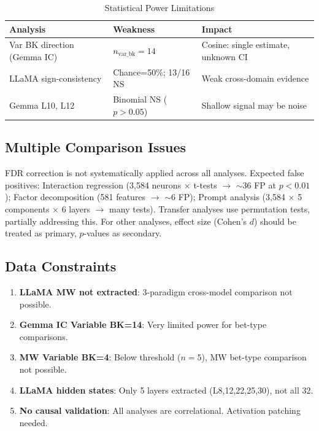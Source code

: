 \documentclass[11pt,a4paper]{article}
\begin{document}
\begin{table}[H]
\centering
\caption{Statistical Power Limitations}\label{tab:power}
\footnotesize
\begin{tabular}{lll}
\toprule
Analysis & Weakness & Impact \\
\midrule
Var BK direction (Gemma IC) & $n_{\mathrm{var\_bk}}=14$ & Cosine: single estimate, unknown CI \\
LLaMA sign-consistency & Chance=50\%; 13/16 NS & Weak cross-domain evidence \\
Gemma L10, L12 & Binomial NS ($p>0.05$) & Shallow signal may be noise \\
\bottomrule
\end{tabular}
\end{table}

\subsection{Multiple Comparison Issues}

FDR correction is not systematically applied across all analyses. Expected false positives: Interaction regression (3,584 neurons $\times$ t-tests $\rightarrow$ $\sim$36 FP at $p<0.01$); Factor decomposition (581 features $\rightarrow$ $\sim$6 FP); Prompt analysis (3,584 $\times$ 5 components $\times$ 6 layers $\rightarrow$ many tests). Transfer analyses use permutation tests, partially addressing this. For other analyses, effect size (Cohen's $d$) should be treated as primary, $p$-values as secondary.

\subsection{Data Constraints}

\begin{enumerate}[nosep]
    \item \textbf{LLaMA MW not extracted}: 3-paradigm cross-model comparison not possible.
    \item \textbf{Gemma IC Variable BK=14}: Very limited power for bet-type comparisons.
    \item \textbf{MW Variable BK=4}: Below threshold ($n=5$), MW bet-type comparison not possible.
    \item \textbf{LLaMA hidden states}: Only 5 layers extracted (L8,12,22,25,30), not all 32.
    \item \textbf{No causal validation}: All analyses are correlational. Activation patching needed.
\end{enumerate}
\end{document}
